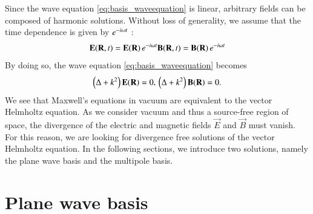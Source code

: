 Since the
wave equation \eqref{eq:basis_waveequation} is linear, arbitrary fields can be
composed of harmonic solutions. Without loss of generality, we assume that
the time dependence is given by $e^{-i\omega t}$
\cite{bohrenhuffman,jackson, stratton}:
\begin{equation}
{\mathbf{E}}({\mathbf{R}},t) = {\mathbf{E}}({\mathbf{R}}) \, e^{-i\omega t} \\
{\mathbf{B}}({\mathbf{R}},t) = {\mathbf{B}}({\mathbf{R}}) \, e^{-i\omega t}
\end{equation}
By doing so, the wave equation \eqref{eq:basis_waveequation} becomes
\begin{equation}
\label{eq:basis_helmholtz}
\left(\Delta + k^2\right) \vec E(\vec R) = 0, \\ \left(\Delta + k^2\right) \vec B(\vec R) = 0.
\end{equation}
We see that Maxwell's equations in vacuum are equivalent to the vector
Helmholtz equation. As we consider vacuum and thus a source-free region of
space, the divergence of the electric and magnetic fields $\vec E$ and $\vec B$
must vanish. For this reason, we are looking for divergence free solutions of
the vector Helmholtz equation. In the following sections, we introduce two
solutions, namely the plane wave basis and the multipole basis.


\section{Plane wave basis}

